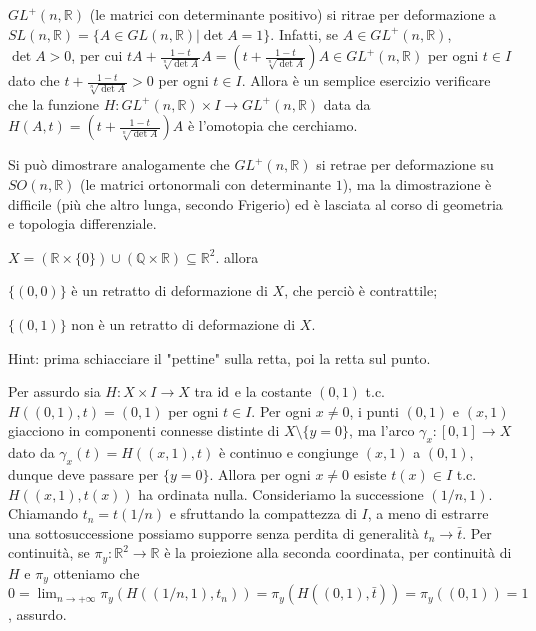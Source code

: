 \begin{ex}
  $GL^+(n, \mathbb{R})$ (le matrici con determinante positivo) si ritrae per deformazione a $SL(n, \mathbb{R})=\{ A \in GL(n, \mathbb{R}) | \det{A}=1\}$. Infatti, se $A \in GL^+(n, \mathbb{R})$, $\det{A}>0$, per cui
  $tA+\frac{1-t}{\sqrt[n]{\det{A}}}A=\left(t+\frac{1-t}{\sqrt[n]{\det{A}}}\right)A \in GL^+(n, \mathbb{R})$ per ogni $t \in I$ dato che $t+\frac{1-t}{\sqrt[n]{\det{A}}}>0$ per ogni $t \in I$.
  Allora è un semplice esercizio verificare che la funzione $H:GL^+(n, \mathbb{R}) \times I \rightarrow GL^+(n, \mathbb{R})$ data da $H(A, t)=\left(t+\frac{1-t}{\sqrt[n]{\det{A}}}\right)A$ è l'omotopia che cerchiamo.
\end{ex}

Si può dimostrare analogamente che $GL^+(n, \mathbb{R})$ si retrae per deformazione su $SO(n, \mathbb{R})$ (le matrici ortonormali con determinante $1$), ma la dimostrazione è difficile (più che altro lunga, secondo Frigerio) ed è lasciata al corso di geometria e topologia differenziale.

\begin{exc}
  $X=(\mathbb{R} \times \{0\}) \cup (\mathbb{Q} \times \mathbb{R}) \subseteq \mathbb{R}^2$. allora
  \begin{nlist}
    \item $\{(0, 0)\}$ è un retratto di deformazione di $X$, che perciò è contrattile;
    \item $\{(0, 1)\}$ non è un retratto di deformazione di $X$.
  \end{nlist}
\end{exc}

\begin{sol}
  \begin{nlist}
    \item Hint: prima schiacciare il "pettine" sulla retta, poi la retta sul punto.
    \item Per assurdo sia $H:X \times I \rightarrow X$ tra $\operatorname{id}$ e la costante $(0, 1)$ t.c. $H((0,1), t)=(0, 1)$ per ogni $t \in I$. Per ogni $x \not=0$, i punti $(0, 1)$ e $(x, 1)$ giacciono in componenti connesse distinte di $X \setminus \{y=0\}$, ma l'arco $\gamma_x:[0, 1] \rightarrow X$ dato da
    $\gamma_x(t)=H((x, 1), t)$ è continuo e congiunge $(x, 1)$ a $(0, 1)$, dunque deve passare per $\{y=0\}$. Allora per ogni $x \not=0$ esiste $t(x) \in I$ t.c. $H((x, 1), t(x))$ ha ordinata nulla. Consideriamo la successione $(1/n, 1)$. Chiamando $t_n=t(1/n)$ e sfruttando la compattezza di $I$, a meno di estrarre una sottosuccessione possiamo supporre senza perdita di generalità $t_n \rightarrow \bar{t}$.
    Per continuità, se $\pi_y: \mathbb{R}^2 \rightarrow \mathbb{R}$ è la proiezione alla seconda coordinata, per continuità di $H$ e $\pi_y$ otteniamo che $\displaystyle 0=\lim_{n \rightarrow +\infty} \pi_y(H((1/n, 1), t_n))=\pi_y(H((0, 1), \bar{t}))=\pi_y((0, 1))=1$, assurdo.
  \end{nlist}
\end{sol}
